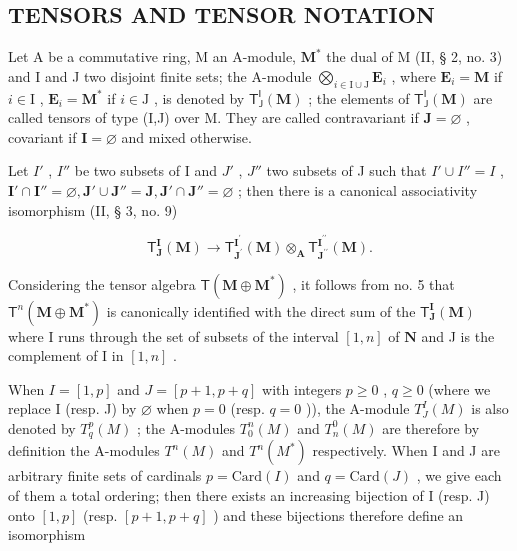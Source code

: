 \subsection{TENSORS AND TENSOR NOTATION}

Let A be a commutative ring, M an A-module, \(\mathbf{M}^*\) the dual of M (II, § 2, no. 3) and I and J two disjoint finite sets; the A-module \(\bigotimes_{i\in \mathrm{I}\cup \mathrm{J}}\mathbf{E}_i\) , where \(\mathbf{E}_i = \mathbf{M}\) if \(i\in \mathrm{I}\) , \(\mathbf{E}_i = \mathbf{M}^*\) if \(i\in \mathrm{J}\) , is denoted by \(\mathsf{T}_{\mathsf{J}}^{\mathsf{I}}(\mathbf{M})\) ; the elements of \(\mathsf{T}_{\mathsf{J}}^{\mathsf{I}}(\mathbf{M})\) are called tensors of type (I,J) over M. They are called contravariant if \(\mathbf{J} = \varnothing\) , covariant if \(\mathbf{I} = \varnothing\) and mixed otherwise.

Let \(I'\) , \(I''\) be two subsets of I and \(J'\) , \(J''\) two subsets of J such that \(I' \cup I'' = I\) , \(\mathbf{I}' \cap \mathbf{I}'' = \varnothing, \mathbf{J}' \cup \mathbf{J}'' = \mathbf{J}, \mathbf{J}' \cap \mathbf{J}'' = \varnothing\) ; then there is a canonical associativity isomorphism (II, § 3, no. 9)

\[
\mathsf {T} _ {\mathbf {J}} ^ {\mathbf {I}} (\mathbf {M}) \rightarrow \mathsf {T} _ {\mathbf {J} ^ {\prime}} ^ {\mathbf {I} ^ {\prime}} (\mathbf {M}) \otimes_ {\mathbf {A}} \mathsf {T} _ {\mathbf {J} ^ {\prime \prime}} ^ {\mathbf {I} ^ {\prime \prime}} (\mathbf {M}).\tag{11}
\]

Considering the tensor algebra \(\mathsf{T}(\mathbf{M}\oplus \mathbf{M}^{*})\) , it follows from no. 5 that \(\mathsf{T}^n (\mathbf{M}\oplus \mathbf{M}^*)\) is canonically identified with the direct sum of the \(\mathsf{T}_{\mathbf{J}}^{\mathbf{I}}(\mathbf{M})\) where I runs through the set of subsets of the interval \([1,n]\) of \(\mathbf{N}\) and J is the complement of I in \([1,n]\) .

When \(I = [1, p]\) and \(J = [p + 1, p + q]\) with integers \(p \geqslant 0\) , \(q \geqslant 0\) (where we replace I (resp. J) by \(\varnothing\) when \(p = 0\) (resp. \(q = 0\) )), the A-module \(T_J^I(M)\) is also denoted by \(T_q^p(M)\) ; the A-modules \(T_0^n(M)\) and \(T_n^0(M)\) are therefore by definition the A-modules \(T^n(M)\) and \(T^n(M^*)\) respectively. When I and J are arbitrary finite sets of cardinals \(p = \text{Card}(I)\) and \(q = \text{Card}(J)\) , we give each of them a total ordering; then there exists an increasing bijection of I (resp. J) onto \([1, p]\) (resp. \([p + 1, p + q]\) ) and these bijections therefore define an isomorphism

